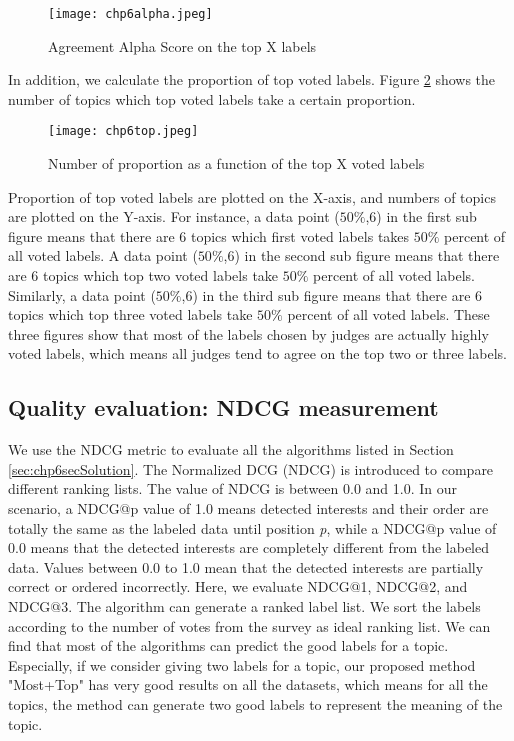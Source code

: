 \begin{figure}[htp]
\caption{Agreement Alpha Score on the top X labels}
\label{fig:chp6alpha} 
\centering
\texttt{[image: chp6alpha.jpeg]}  
\end{figure}


In addition, we calculate the proportion of top voted labels. Figure \ref{fig:chp6top} shows the number of topics which top voted labels take a certain proportion.
\begin{figure}[htp]
\centering
\texttt{[image: chp6top.jpeg]}  
\caption{Number of proportion as a function of the top X voted labels}
\label{fig:chp6top} 
\end{figure}
Proportion of top voted labels are plotted on the X-axis, and numbers of topics are plotted on the Y-axis. For instance, a data point ($50\%$,6) in the first sub figure means that there are 6 topics which first voted labels takes $50\%$ percent of all voted labels. A data point ($50\%$,6) in the second sub figure means that there are 6 topics which top two voted labels take $50\%$ percent of all voted labels. Similarly, a data point ($50\%$,6) in the third sub figure means that there are 6 topics which top three voted labels take $50\%$ percent of all voted labels. These three figures show that most of the labels chosen by judges are actually highly voted labels, which means all judges tend to agree on the top two or three labels.




\subsection{Quality evaluation: NDCG measurement}
We use the NDCG metric to evaluate all the algorithms listed in Section \ref{sec:chp6secSolution}. The Normalized DCG (NDCG) is introduced to compare different ranking lists. The value of NDCG is between 0.0 and 1.0. In our scenario, a NDCG@p value of 1.0 means detected interests and their order are totally the same as the labeled data until position \textit{p}, while a NDCG@p value of 0.0 means that the detected interests are completely different from the labeled data. Values between 0.0 to 1.0 mean that the detected interests are partially correct or ordered incorrectly. 
Here, we evaluate NDCG@1, NDCG@2, and NDCG@3. The algorithm can generate a ranked label list. We sort the labels according to the number of votes from the survey as ideal ranking list. 
We can find that most of the algorithms can predict the good labels for a topic. Especially, if we consider giving two labels for a topic, our proposed method "Most+Top" has very good results on all the datasets, which means for all the topics, the method can generate two good labels to represent the meaning of the topic.

